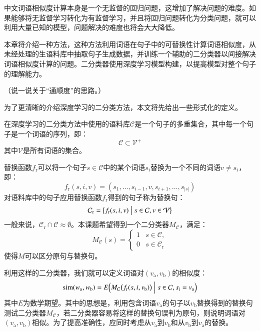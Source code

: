 
中文词语相似度计算本身是一个无监督的回归问题，这增加了解决问题的难度。如果能够将无监督学习转化为有监督学习，并且将回归问题转化为分类问题，就可以利用大量已知的模型，问题解决的难度也将会大大降低。

本章将介绍一种方法，这种方法利用词语在句子中的可替换性计算词语相似度，从未经处理的生语料库中抽取句子生成数据，并训练一个辅助的二分类器以间接解决词语相似度计算的问题。二分类器使用深度学习模型构建，以提高模型对整个句子的理解能力。

（说一说关于“通顺度”的思路。）

为了更清晰的介绍深度学习的二分类方法，本文将先给出一些形式化的定义。

在深度学习的二分类方法中使用的语料库$\mathcal{C}$是一个句子的多重集合，其中每一个句子是一个词语的序列，即：
\begin{equation}
\mathcal{C} \subset \mathcal{V}^+
\end{equation}
其中$\mathcal{V}$是所有词语的集合。

替换函数$f_\text{r}$可以将一个句子$s \in \mathcal{C}$中的某个词语$s_i$替换为一个不同的词语$v \ne s_i$，即：
\begin{equation}
f_\text{r}(s, i, v) = (s_1, \dots, s_{i - 1}, v, s_{i + 1}, \dots, s_{|s|})
\end{equation}
对语料库中的句子应用替换函数$f_\text{r}$得到的句子称为替换句：
\begin{equation}
\mathcal{C}_\text{r} = \bigl\{f_\text{r}(s, i, v) \bigm| s \in \mathcal{C}, v \in \mathcal{V}\bigr\}
\end{equation}
一般来说，$\mathcal{C}_\text{r} \cap \mathcal{C} \approx \emptyset$。本课题希望得到一个二分类器$M_\mathcal{C}$，满足：
\begin{equation}
M_\mathcal{C}(s) = 
\begin{cases}
1 & s \in \mathcal{C}, \\
0 & s \in \mathcal{C}_\text{r}
\end{cases}
\end{equation}
使得$M$可以区分原句与替换句。

利用这样的二分类器，我们就可以定义词语对$(v_\text{a}, v_\text{b})$的相似度：
\begin{equation}
\operatorname{sim}(w_\text{a}, w_\text{b}) = E\Bigl(M_\mathcal{C}\bigl(f_\text{r}(s, i, v_\text{b})\bigr) \Bigm| s \in \mathcal{C}, s_i = v_\text{a}\Bigr)
\end{equation}
其中$E$为数学期望。其中的思想是，利用包含词语$v_\text{a}$的句子以$v_\text{b}$替换得到的替换句测试二分类器$M_\mathcal{C}$，若二分类器容易将这样的替换句误判为原句，则说明词语对$(v_\text{a}, v_\text{b})$相似。为了提高准确性，应同时考虑从$v_\text{a}$到$v_\text{b}$和从$v_\text{b}$到$v_\text{a}$的替换。

